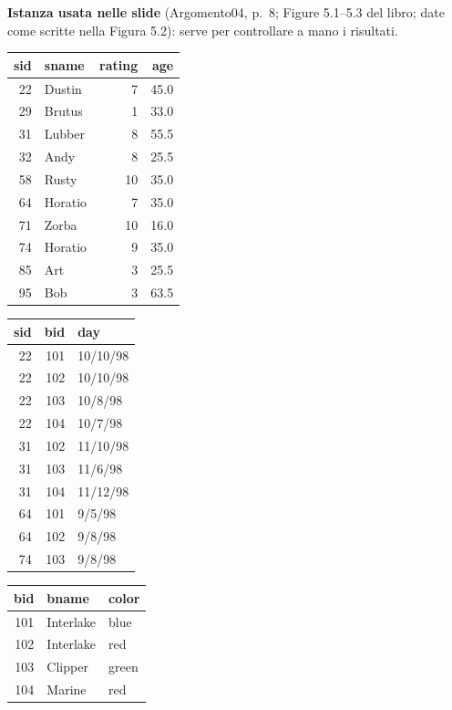 \documentclass[12pt, a4paper]{article}
\begin{document}
\textbf{Istanza usata nelle slide} (Argomento04, p.~8; Figure 5.1--5.3 del libro; date come scritte nella Figura 5.2): serve per controllare a mano i risultati.
\begin{center}
\small
\setlength{\tabcolsep}{4pt}
\begin{tabular}[t]{rlrr}
\toprule
\textbf{sid} & \textbf{sname} & \textbf{rating} & \textbf{age}\\
\midrule
22 & Dustin & 7 & 45.0\\
29 & Brutus & 1 & 33.0\\
31 & Lubber & 8 & 55.5\\
32 & Andy & 8 & 25.5\\
58 & Rusty & 10 & 35.0\\
64 & Horatio & 7 & 35.0\\
71 & Zorba & 10 & 16.0\\
74 & Horatio & 9 & 35.0\\
85 & Art & 3 & 25.5\\
95 & Bob & 3 & 63.5\\
\bottomrule
\end{tabular}
\hspace{1.2em}
\begin{tabular}[t]{rrl}
\toprule
\textbf{sid} & \textbf{bid} & \textbf{day}\\
\midrule
22 & 101 & 10/10/98\\
22 & 102 & 10/10/98\\
22 & 103 & 10/8/98\\
22 & 104 & 10/7/98\\
31 & 102 & 11/10/98\\
31 & 103 & 11/6/98\\
31 & 104 & 11/12/98\\
64 & 101 & 9/5/98\\
64 & 102 & 9/8/98\\
74 & 103 & 9/8/98\\
\bottomrule
\end{tabular}
\hspace{1.2em}
\begin{tabular}[t]{rll}
\toprule
\textbf{bid} & \textbf{bname} & \textbf{color}\\
\midrule
101 & Interlake & blue\\
102 & Interlake & red\\
103 & Clipper & green\\
104 & Marine & red\\
\bottomrule
\end{tabular}
\end{center}
\end{document}
